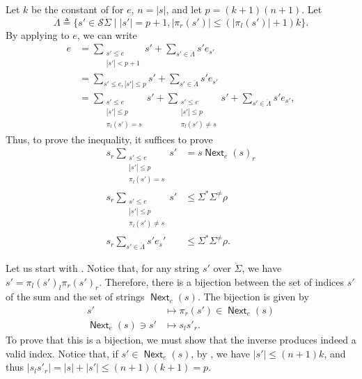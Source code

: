 \documentclass[11pt,a4paper]{amsart}
\theoremstyle{definition}
\DeclareMathOperator{\Next}{\mathsf{Next}}
\begin{document}
\begin{proofEnd}
  Let $k$ be the constant of  for $e$,
  $n = |s|$, and let $p = (k+1)(n+1)$. Let
  \[ \ddot{ \Lambda }  \triangleq  \{s'  \in  \mathcal{S}\ddot{ \Sigma }  \mid  |s'| =p+1, | \pi _r(s')|  \leq  (| \pi _l(s')| + 1)k \}.\] By
  applying  to $e$, we can write
  \begin{align*}
    e
    & =  \sum _{\substack{s'  \leq  e \\ |s'| < p+1}} s' + %
       \sum _{s'  \in  \ddot{ \Lambda }}s'e_{s'} \\
    & =  \sum _{s'  \leq  e, |s'|  \leq  p} s' + %
       \sum _{s'  \in  \ddot{ \Lambda }}s'e_{s'} \\
    & =  \sum _{\substack{s'  \leq  e \\ |s'|  \leq  p \\  \pi _l(s') = s}} s' + %
       \sum _{\substack{s'  \leq  e \\ |s'|  \leq  p \\  \pi _l(s')  \neq  s}} s' + %
       \sum _{s'  \in  \ddot{ \Lambda }} s' e_{s'},
  \end{align*}
  Thus, to prove the inequality, it suffices to prove
  \begin{align}
    s_r \sum _{\substack{s' \leq e \\ |s'|  \leq  p \\  \pi _l(s') = s}} s'
    & = s \Next_e(s)_r
      \label{eq:representable-goal-1} \\
    s_r \sum _{\substack{s' \leq e \\ |s'|  \leq  p \\  \pi _l(s')  \neq  s}} s'
    &  \leq   \Sigma ^* \Sigma ^{ \neq } \rho 
      \label{eq:representable-goal-2} \\
    s_r \sum _{s'  \in  \ddot{ \Lambda }}s'e_s'
    &  \leq   \Sigma ^* \Sigma ^{ \neq } \rho 
      \label{eq:representable-goal-3}.
  \end{align}

  Let us start with .  Notice that, for any
  string $s'$ over $\ddot{ \Sigma }$, we have $s' =  \pi _l(s')_l \pi _r(s')_r$.  Therefore,
  there is a bijection between the set of indices $s'$ of the sum and the set of
  strings $\Next_e(s)$.  The bijection is given by
  \begin{align*}
    s' &  \mapsto   \pi _r(s')  \in  \Next_e(s) \\
    \Next_e(s)  \ni  s' &  \mapsto  s_ls'_r.
  \end{align*}
  To prove that this is a bijection, we must show that the inverse produces
  indeed a valid index.  Notice that, if $s'  \in  \Next_e(s)$, by
  , we have $|s'|  \leq  (n+1)k$, and thus
  $|s_ls'_r| = |s|+|s'|  \leq  (n+1)(k+1) = p$.


\end{proofEnd}
\end{document}

